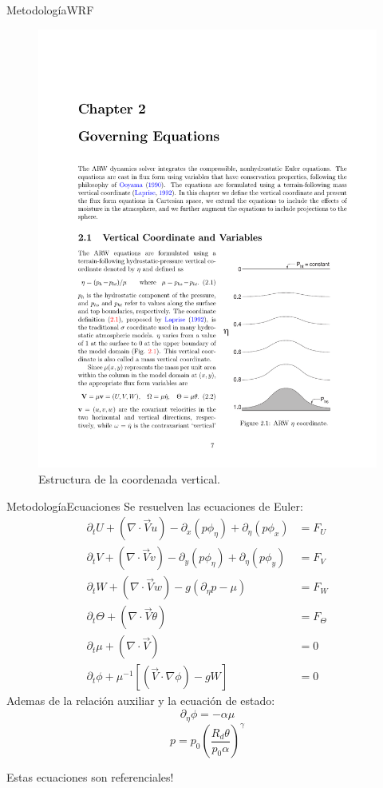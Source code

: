 \documentclass[mathserif]{beamer}
\newcommand{\be}{\begin{equation}}
\newcommand{\ee}{\end{equation}}
\begin{document}
\begin{frame}{Metodología}{WRF}
	\begin{figure}[H]
		\centering
		\includegraphics[width=0.55\linewidth,trim={11.5cm 3.3cm 1cm 14cm},clip]{eta}
		\caption{Estructura de la coordenada vertical.}
		\label{fig:eta}
	\end{figure}
\end{frame}

\begin{frame}{Metodología}{Ecuaciones}
Se resuelven las ecuaciones de Euler:
\begin{align} \partial_t U + (\nabla\cdot\vec{V}u)-\partial_x(p\phi_\eta) + \partial_\eta (p\phi_x) &= F_U \\
\partial_t V + (\nabla\cdot\vec{V}v)-\partial_y(p\phi_\eta) + \partial_\eta (p\phi_y) &= F_V \\
\partial_t W + (\nabla\cdot\vec{V}w)- g(\partial_\eta p - \mu) &= F_W \\
\partial_t\Theta + (\nabla\cdot \vec{V}\theta) &= F_\Theta \\
\partial_t\mu + (\nabla\cdot \vec{V})&= 0 \\
\partial_t\phi + \mu^{-1}[(\vec{V}\cdot\nabla\phi)-gW] &= 0
\end{align}
Ademas de la relación auxiliar y la ecuación de estado:
\be \partial_\eta\phi = -\alpha\mu \ee 
\be p = p_0 \left( \frac{R_d\theta}{p_0\alpha} \right)^\gamma \ee

Estas ecuaciones son referenciales!
\end{frame}
\end{document}
